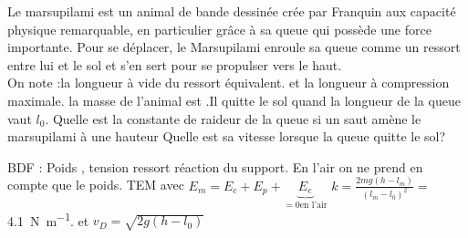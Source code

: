 \begin{Exercise}[title=Le marsupilami]
	Le marsupilami est un animal de bande dessinée crée par Franquin aux
    capacité physique remarquable, en particulier grâce à sa queue qui possède
    une force importante. Pour se déplacer, le Marsupilami enroule sa queue
    comme un ressort entre lui et le sol et s'en sert pour se propulser vers le
    haut.\\
    On note  :la longueur à vide du ressort équivalent. et
     la longueur à compression maximale. la masse  de l'animal
    est .Il quitte le sol quand la longueur de la queue vaut
    $l_0$.
    \Question Quelle est la constante de raideur de la queue si un saut amène le
    marsupilami à une hauteur  Quelle est sa vitesse lorsque la
    queue quitte le sol?
\end{Exercise}
\begin{Answer}
	BDF : Poids , tension ressort réaction du support. En l'air on ne prend en compte que le poids.
	\Question TEM avec $E_m= E_c+E_p+\underbrace{E_e}_{=0 \text{en l'air}}$
	$k=\frac{2mg(h-l_m)}{(l_m-l_0)^2}=$\SI{4,1}{N\per\m}. et $v_D=\sqrt{2g(h-l_0)}$
\end{Answer}
